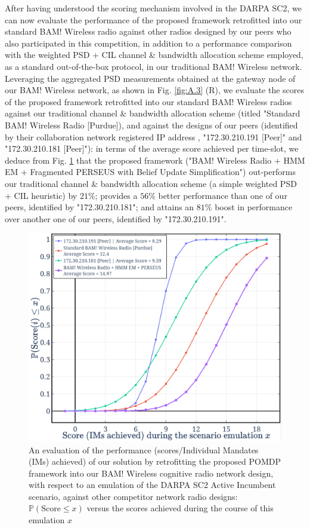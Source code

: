 \documentclass[12pt, draftcls, onecolumn]{IEEEtran}
\begin{document}
After having understood the scoring mechanism involved in the DARPA SC2, we can now evaluate the performance of the proposed framework retrofitted into our standard BAM! Wireless radio \cite{BAM} against other radios designed by our peers who also participated in this competition, in addition to a performance comparison with the weighted PSD + CIL \cite{DARPA:CIL} channel \& bandwidth allocation scheme employed, as a standard out-of-the-box protocol, in our traditional BAM! Wireless network. Leveraging the aggregated PSD measurements obtained at the gateway node of our BAM! Wireless network, as shown in Fig. \ref{fig:A.3} (R), we evaluate the scores of the proposed framework retrofitted into our standard BAM! Wireless radios against our traditional channel \& bandwidth allocation scheme (titled "Standard BAM! Wireless Radio [Purdue]), and against the designs of our peers (identified by their collaboration network registered IP address \cite{DARPA:CIL}, "172.30.210.191 [Peer]" and "172.30.210.181 [Peer]"): in terms of the average score achieved per time-slot, we deduce from Fig. \ref{fig: Y. 4} that the proposed framework ("BAM! Wireless Radio + HMM EM + Fragmented PERSEUS with Belief Update Simplification") out-performs our traditional channel \& bandwidth allocation scheme (a simple weighted PSD + CIL heuristic) by $21$\%; provides a $56$\% better performance than one of our peers, identified by "172.30.210.181"; and attains an $81$\% boost in performance over another one of our peers, identified by "172.30.210.191".
\begin{figure} [t]
    \centerline{
    \includegraphics[width=0.8\linewidth]{figures/Minerva_DARPA_SC2_Scores_plot.png}}
    \vspace{-6mm}
    \caption{An evaluation of the performance (scores/Individual Mandates (IMs) achieved) of our solution by retrofitting the proposed POMDP framework into our BAM! Wireless cognitive radio network design, with respect to an emulation of the DARPA SC2 Active Incumbent scenario, against other competitor network radio designs: $\mathbb{P}(\text{Score}{\leq}x)$ versus the scores achieved during the course of this emulation $x$}
    \vspace{-7mm}
    \label{fig: Y. 4}
\end{figure}
\end{document}
